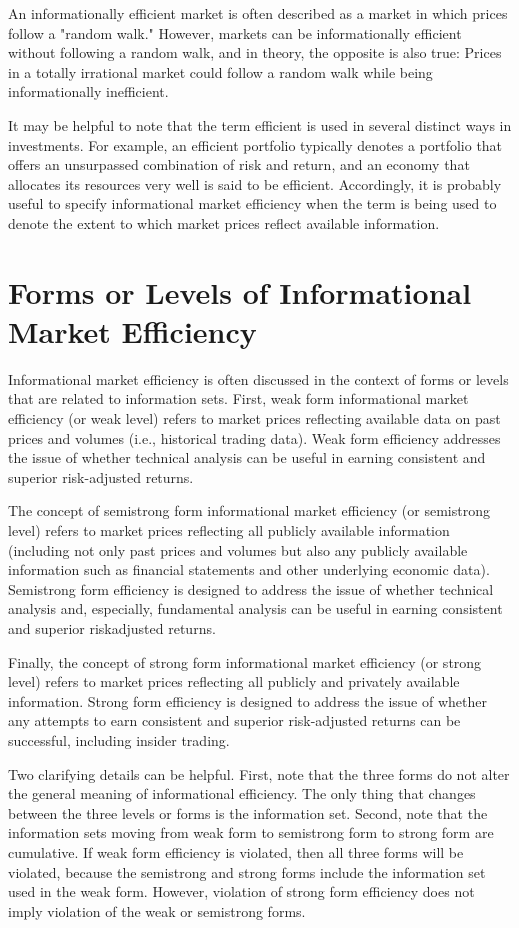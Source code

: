 \documentclass[11pt]{article}
\begin{document}
An informationally efficient market is often described as a market in which prices follow a "random walk." However, markets can be informationally efficient without following a random walk, and in theory, the opposite is also true: Prices in a totally irrational market could follow a random walk while being informationally inefficient.

It may be helpful to note that the term efficient is used in several distinct ways in investments. For example, an efficient portfolio typically denotes a portfolio that offers an unsurpassed combination of risk and return, and an economy that allocates its resources very well is said to be efficient. Accordingly, it is probably useful to specify informational market efficiency when the term is being used to denote the extent to which market prices reflect available information.

\section*{Forms or Levels of Informational Market Efficiency}
Informational market efficiency is often discussed in the context of forms or levels that are related to information sets. First, weak form informational market efficiency (or weak level) refers to market prices reflecting available data on past prices and volumes (i.e., historical trading data). Weak form efficiency addresses the issue of whether technical analysis can be useful in earning consistent and superior risk-adjusted returns.

The concept of semistrong form informational market efficiency (or semistrong level) refers to market prices reflecting all publicly available information (including not only past prices and volumes but also any publicly available information such as financial statements and other underlying economic data). Semistrong form efficiency is designed to address the issue of whether technical analysis and, especially, fundamental analysis can be useful in earning consistent and superior riskadjusted returns.

Finally, the concept of strong form informational market efficiency (or strong level) refers to market prices reflecting all publicly and privately available information. Strong form efficiency is designed to address the issue of whether any attempts to earn consistent and superior risk-adjusted returns can be successful, including insider trading.

Two clarifying details can be helpful. First, note that the three forms do not alter the general meaning of informational efficiency. The only thing that changes between the three levels or forms is the information set. Second, note that the information sets moving from weak form to semistrong form to strong form are cumulative. If weak form efficiency is violated, then all three forms will be violated, because the semistrong and strong forms include the information set used in the weak form. However, violation of strong form efficiency does not imply violation of the weak or semistrong forms.
\end{document}
